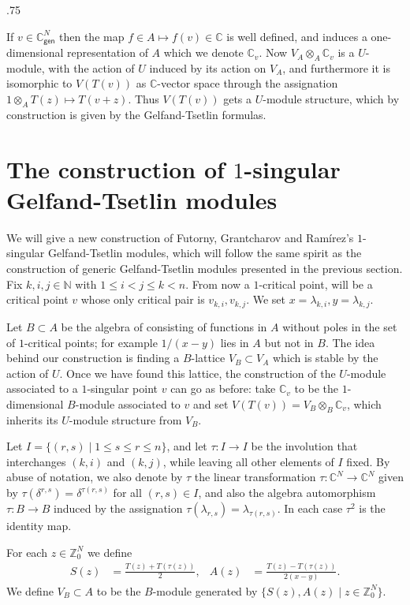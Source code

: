 \documentclass[11pt,fleqn]{article}
\makeatletter
\renewenvironment{proof}[1][\textit{Proof}]{\par
  \pushQED{\qed}%
  \normalfont \topsep.75\paraskip\relax
  \trivlist
  \item[\hskip\labelsep
        \itshape
    #1\@addpunct{.}]\ignorespaces
}{%
  \popQED\endtrivlist\@endpefalse
}
\newcommand\NN{\mathbb N}
\newcommand\CC{\mathbb C}
\newcommand\ZZ{\mathbb Z}
\newcommand\ot{\otimes}
\renewcommand\to{\longrightarrow}
\newcommand\gen{\mathsf{gen}}
\makeatother
\begin{document}
\begin{proof}[Proof of Theorem \ref{T:generic-GT}]
\label{GT-generic-proof}
If $v \in \CC_\gen^N$ then the map $f \in A \mapsto f(v) \in \CC$ is well
defined, and induces a one-dimensional representation of $A$ which we denote
$\CC_v$. Now $V_A \ot_A \CC_v$ is a $U$-module, with the action of $U$ induced
by its action on $V_A$, and furthermore it is isomorphic to $V(T(v))$ as 
$\CC$-vector space through the assignation $1 \ot_A T(z) \mapsto T(v+z)$. 
Thus $V(T(v))$ gets a $U$-module structure, which by construction is given by
the Gelfand-Tsetlin formulas. 
\end{proof}

\section{The construction of $1$-singular Gelfand-Tsetlin modules}
We will give a new construction of Futorny, Grantcharov and Ramírez's 
$1$-singular Gelfand-Tsetlin modules, which will follow the same spirit as the 
construction of generic Gelfand-Tsetlin modules presented in the previous 
section. Fix $k,i,j \in \NN$ with $1 \leq i < j \leq k <n$. From now a 
$1$-critical point, will be a critical point $v$ whose only critical pair is 
$v_{k,i}, v_{k,j}$. We set $x = \lambda_{k,i}, y = \lambda_{k,j}$. 

Let $B \subset A$ be the algebra of consisting of functions in $A$ without 
poles in the set of $1$-critical points; for example $1/(x-y)$ lies in $A$
but not in $B$. The idea behind our construction is finding a $B$-lattice $V_B 
\subset V_A$ which is stable by the action of $U$. Once we have found this 
lattice, the construction of the $U$-module associated to a $1$-singular point 
$v$ can go as before: take $\CC_v$ to be the $1$-dimensional $B$-module 
associated to $v$ and set $V(T(v)) = V_B \ot_B \CC_v$, which inherits its 
$U$-module structure from $V_B$.

Let $I = \{(r,s) \mid 1 \leq s \leq r \leq n\}$, and let $\tau: I \to I$ be 
the involution that interchanges $(k,i)$ and $(k,j)$, while leaving all other
elements of $I$ fixed. By abuse of notation, we also denote by $\tau$ the 
linear transformation $\tau: \CC^N \to \CC^N$ given by $\tau(\delta^{r,s}) =
\delta^{\tau(r,s)}$ for all $(r,s) \in I$, and also the algebra automorphism
$\tau: B \to B$ induced by the assignation $\tau(\lambda_{r,s}) = 
\lambda_{\tau(r,s)}$. In each case $\tau^2$ is the identity map.

\begin{Definition}
\label{D:V-B}
For each $z \in \ZZ^N_0$ we define 
\begin{align*}
S(z)
	&= \frac{T(z) + T(\tau(z))}{2},
&A(z)
	&= \frac{T(z) - T(\tau(z))}{2(x-y)}.
\end{align*}
We define $V_B \subset A$ to be the $B$-module generated by $\{S(z), A(z) \mid
z \in \ZZ^N_0\}$.
\end{Definition}
\end{document}
